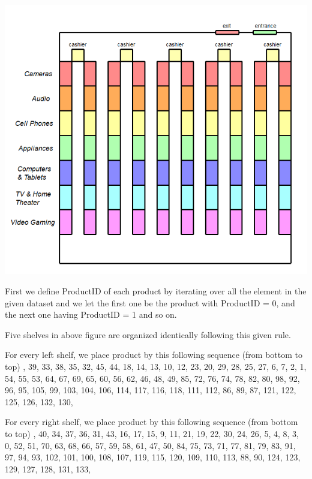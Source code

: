 \begin{center}
    \includegraphics[width=\textwidth]{fig4.3.PNG}
\end{center}

First we define ProductID of each product by iterating over all the element in the given dataset and we let the first one be the product with ProductID = 0, and the next one having ProductID = 1 and so on.
\newline \par
Five shelves in above figure are organized identically following this given rule.
\newline
\par For every left shelf, we place product by this following sequence (from bottom to top)
, 39, 33, 38, 35, 32, 45, 44, 18, 14, 13, 10, 12, 23, 20, 29, 28, 25, 27, 6, 7, 2, 1, 54, 55, 53, 64, 67, 69, 65, 60, 56, 62, 46, 48, 49, 85, 72, 76, 74, 78, 82, 80, 98, 92, 96, 95, 105, 99, 103, 104, 106, 114, 117, 116, 118, 111, 112, 86, 89, 87, 121, 122, 125, 126, 132, 130, 
\newline \par
For every right shelf, we place product by this following sequence (from bottom to top) , 40, 34, 37, 36, 31, 43, 16, 17, 15, 9, 11, 21, 19, 22, 30, 24, 26, 5, 4, 8, 3, 0, 52, 51, 70, 63, 68, 66, 57, 59, 58, 61, 47, 50, 84, 75, 73, 71, 77, 81, 79, 83, 91, 97, 94, 93, 102, 101, 100, 108, 107, 119, 115, 120, 109, 110, 113, 88, 90, 124, 123, 129, 127, 128, 131, 133, 

